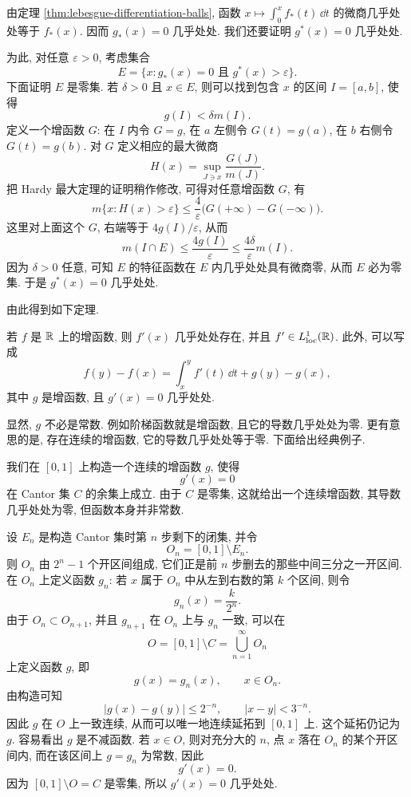 由定理 \ref{thm:lebesgue-differentiation-balls}, 函数 \(x\mapsto\int_0^x f_*(t)\,\dd t\) 的微商几乎处处等于 \(f_*(x)\). 因而 \(g_*(x)=0\) 几乎处处. 我们还要证明 \(g^*(x)=0\) 几乎处处.

为此, 对任意 \(\varepsilon>0\), 考虑集合
\[
E=\{x:g_*(x)=0\text{ 且 }g^*(x)>\varepsilon\}.
\]
下面证明 \(E\) 是零集. 若 \(\delta>0\) 且 \(x\in E\), 则可以找到包含 \(x\) 的区间 \(I=[a,b]\), 使得
\[
g(I)<\delta m(I).
\]
定义一个增函数 \(G\): 在 \(I\) 内令 \(G=g\), 在 \(a\) 左侧令 \(G(t)=g(a)\), 在 \(b\) 右侧令 \(G(t)=g(b)\). 对 \(G\) 定义相应的最大微商
\[
H(x)=\sup_{J\ni x}\frac{G(J)}{m(J)}.
\]
把 Hardy 最大定理的证明稍作修改, 可得对任意增函数 \(G\), 有
\[
m\{x:H(x)>\varepsilon\}\leq \frac{4}{\varepsilon}\bigl(G(+\infty)-G(-\infty)\bigr).
\]
这里对上面这个 \(G\), 右端等于 \(4g(I)/\varepsilon\), 从而
\[
m(I\cap E)
\leq \frac{4g(I)}{\varepsilon}
\leq \frac{4\delta}{\varepsilon}m(I).
\]
因为 \(\delta>0\) 任意, 可知 \(E\) 的特征函数在 \(E\) 内几乎处处具有微商零, 从而 \(E\) 必为零集. 于是 \(g^*(x)=0\) 几乎处处.

由此得到如下定理.

\begin{thm}\label{thm:monotone-function-ae-differentiable}
	若 \(f\) 是 \(\mathbb{R}\) 上的增函数, 则 \(f'(x)\) 几乎处处存在, 并且 \(f'\in L^1_{\operatorname{loc}}(\mathbb{R})\). 此外, 可以写成
	\begin{equation}
		f(y)-f(x)=\int_x^y f'(t)\,\dd t+g(y)-g(x),
		\label{eq:monotone-decomposition}
	\end{equation}
	其中 \(g\) 是增函数, 且 \(g'(x)=0\) 几乎处处.
\end{thm}

显然, \(g\) 不必是常数. 例如阶梯函数就是增函数, 且它的导数几乎处处为零. 更有意思的是, 存在连续的增函数, 它的导数几乎处处等于零. 下面给出经典例子.

\begin{exam}[Cantor 函数]
	\label{exam:cantor-function}
	我们在 \([0,1]\) 上构造一个连续的增函数 \(g\), 使得
	\[
	g'(x)=0
	\]
	在 Cantor 集 \(C\) 的余集上成立. 由于 \(C\) 是零集, 这就给出一个连续增函数, 其导数几乎处处为零, 但函数本身并非常数.
	
	设 \(E_n\) 是构造 Cantor 集时第 \(n\) 步剩下的闭集, 并令
	\[
	O_n=[0,1]\setminus E_n.
	\]
	则 \(O_n\) 由 \(2^n-1\) 个开区间组成, 它们正是前 \(n\) 步删去的那些中间三分之一开区间. 在 \(O_n\) 上定义函数 \(g_n\): 若 \(x\) 属于 \(O_n\) 中从左到右数的第 \(k\) 个区间, 则令
	\[
	g_n(x)=\frac{k}{2^n}.
	\]
	由于 \(O_n\subset O_{n+1}\), 并且 \(g_{n+1}\) 在 \(O_n\) 上与 \(g_n\) 一致, 可以在
	\[
	O=[0,1]\setminus C=\bigcup_{n=1}^{\infty}O_n
	\]
	上定义函数 \(g\), 即
	\[
	g(x)=g_n(x),\qquad x\in O_n.
	\]
	由构造可知
	\[
	|g(x)-g(y)|\leq 2^{-n},
	\qquad |x-y|<3^{-n}.
	\]
	因此 \(g\) 在 \(O\) 上一致连续, 从而可以唯一地连续延拓到 \([0,1]\) 上. 这个延拓仍记为 \(g\). 容易看出 \(g\) 是不减函数. 若 \(x\in O\), 则对充分大的 \(n\), 点 \(x\) 落在 \(O_n\) 的某个开区间内, 而在该区间上 \(g=g_n\) 为常数, 因此
	\[
	g'(x)=0.
	\]
	因为 \([0,1]\setminus O=C\) 是零集, 所以 \(g'(x)=0\) 几乎处处.
\end{exam}